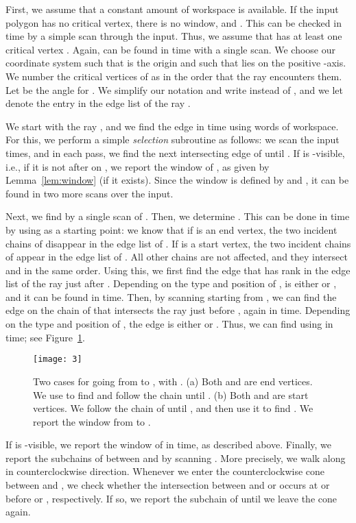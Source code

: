 \documentclass[11pt, a4paper]{article}
\begin{document}
First, we assume that a constant amount of workspace is 
available. 
If the input polygon  has no critical vertex, there 
is no window, and . This can be checked
in  time by a simple scan through the input.
Thus, we assume that 
 has at least one critical vertex . 
Again,  can be found in  time with a single scan.
We choose our coordinate system such that
 is the origin and such that  lies on the positive -axis.
We number the critical vertices of  as  in the order that the ray 
encounters them. Let  be the angle for .
We simplify our notation and write  instead
of , and we let  denote the 
 entry in the edge list of the ray . 

We start with the ray , and we find 
the edge  in  time using  words of workspace. 
For this, we perform a simple \emph{selection} subroutine as follows:
we scan the input  times, and in each pass, we find
the next intersecting edge of  until 
. If  is -visible, i.e., if it is not after  
 on , we report the window of 
, as given by Lemma~\ref{lem:window} (if it exists). 
Since the window is defined by  and , 
it can be found in two more scans over the input.

Next, we find  by a single scan of .
Then, we determine . 
This can be done in  time 
by using  as a starting point: we know that 
if  is an end
vertex, the two incident chains of  disappear
in the edge list of . If  is a start
vertex, the two incident chains of  appear 
in the edge list of .
All other chains are not affected, and they intersect  and 
 in the same order. 
Using this, we first find the edge  that has
rank  in the edge list of the ray  just after
. Depending on the type and position of ,
 is either  or , and it can
be found in  time. Then,
by scanning  starting from , we can
find the edge  on the chain of  that intersects
the ray  just before , again
in  time. Depending on the type and position of , 
the edge  is either  or . 
Thus, we can find  using  in  time; 
see Figure~\ref{fig:fig3}.

\begin{figure}
 \centering 
 \texttt{[image: 3]}
\caption{Two cases for going from  to , with
. 
(a) Both  and  are end vertices. We
use  to find  and follow the chain until
.
(b) Both  and  are start vertices.
We follow the chain of  until , and
then use it to find .
We report the window from  to .}
\label{fig:fig3}
\end{figure}


If  is -visible, we report the window of 
 in  time, as described above.
Finally, we
report the subchains of  between  
and  by scanning . More precisely, 
we walk along  in counterclockwise direction.
Whenever we enter the counterclockwise cone between  and ,
we check whether the intersection between  and
 or  occurs at or before  or , respectively.
If so, we report the subchain of  until
we leave the cone again.
\end{document}
